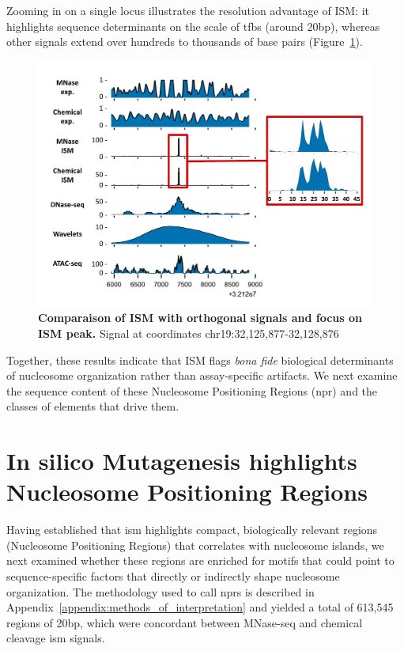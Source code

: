 \documentclass[11pt]{book}
\begin{document}
\FloatBarrier
Zooming in on a single locus illustrates the resolution advantage of ISM: it highlights sequence determinants on the scale of \gls{tfbs} (around 20bp), whereas other signals extend over hundreds to thousands of base pairs (Figure~\ref{fig:omics_uniq}).


\begin{figure}[htbp]
    \centering
    \includegraphics[width=\textwidth]{Figures/Results/multiomics_comparison_onesite.pdf}
    \caption{\textbf{Comparaison of ISM with orthogonal signals and focus on ISM peak.} Signal at coordinates chr19:32,125,877-32,128,876}
    \label{fig:omics_uniq}
\end{figure}


Together, these results indicate that ISM flags \textit{bona fide} biological determinants of nucleosome organization rather than assay-specific artifacts. We next examine the sequence content of these Nucleosome Positioning Regions (\gls{npr}) and the classes of elements that drive them.

\FloatBarrier
\section{In silico Mutagenesis highlights Nucleosome Positioning Regions}
Having established that \gls{ism} highlights compact, biologically relevant regions (Nucleosome Positioning Regions) that correlates with nucleosome islands, we next examined whether these regions are enriched for motifs that could point to sequence-specific factors that directly or indirectly shape nucleosome organization. The methodology used to call \glspl{npr} is described in Appendix~\ref{appendix:methods_of_interpretation} and yielded a total of 613,545 regions of 20bp, which were concordant between MNase-seq and chemical cleavage \gls{ism} signals.
\end{document}
